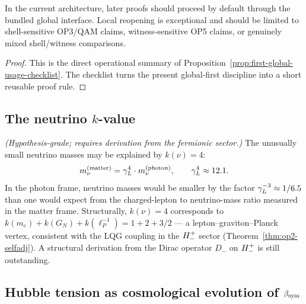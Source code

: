 \begin{corollary}
\label{cor:practical-default-rule-global-first-local-only-if-needed}
In the current architecture, later proofs should proceed by default through the bundled global interface. Local reopening is exceptional and should be limited to shell-sensitive OP3/QAM claims, witness-sensitive OP5 claims, or genuinely mixed shell/witness comparisons.
\end{corollary}

\begin{proof}
This is the direct operational summary of Proposition~\ref{prop:first-global-usage-checklist}. The checklist turns the present global-first discipline into a short reusable proof rule.
\end{proof}


\subsection[The neutrino k-value]{The neutrino \texorpdfstring{$k$}{k}-value}

\begin{proposition}[$k(\nu) = 4$ as hypothesis, hypothesis-grade]
\label{prop:k-neutrino}
\emph{(Hypothesis-grade; requires derivation from the fermionic sector.)}
The unusually small neutrino masses may be explained by $k(\nu) = 4$:
\[
  m_\nu^{(\mathrm{matter})} = \gamma_L^4 \cdot m_\nu^{(\mathrm{photon})},
  \qquad \gamma_L^4 \approx 12.1.
\]
In the photon frame, neutrino masses would be smaller by the factor
$\gamma_L^{-3} \approx 1/6.5$ than one would expect from the charged-lepton to
neutrino-mass ratio measured in the matter frame.
Structurally, $k(\nu) = 4$ corresponds to
$k(m_e)+k(G_N)+k(\ell_P^{-1}) = 1+2+3/2$ --- a lepton--graviton--Planck
vertex, consistent with the LQG coupling in the $H^+_-$ sector
(Theorem~\ref{thm:op2-selfadj}).
A structural derivation from the Dirac operator $D_-$ on $H^+_-$
is still outstanding.
\end{proposition}

\subsection{Hubble tension as cosmological evolution of $\beta_{\mathrm{sym}}$}

